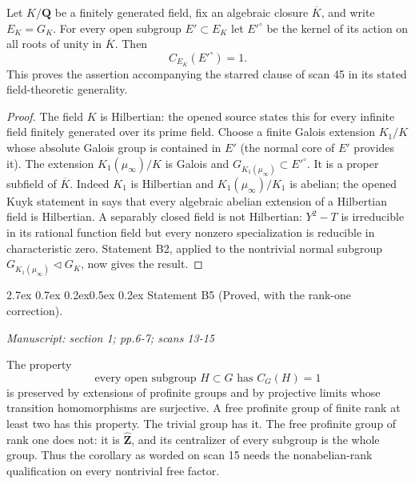 \documentclass[11pt,a4paper]{article}
\makeatletter
\newcommand{\passage}[1]{\par\smallskip\noindent\textit{Manuscript: #1}\par\smallskip}
\renewcommand\paragraph{\@startsection{paragraph}{4}{\z@}%
  {2.7ex \@plus 0.7ex \@minus 0.2ex}{0.5ex \@plus 0.2ex}%
  {\normalfont\normalsize\bfseries}}
\makeatother
\begin{document}
Let $K/\mathbf Q$ be a finitely generated field, fix an algebraic closure
$\overline K$, and write $E_K=G_K$. For every open subgroup $E'\subset E_K$
let $E'^\circ$ be the kernel of its action on all roots of unity in
$\overline K$. Then
\[
 C_{E_K}(E'^\circ)=1.
\]
This proves the assertion accompanying the starred clause of scan 45 in
its stated field-theoretic generality.

\begin{proof}
The field $K$ is Hilbertian: the opened source
\cite[\S4, Theorem 2(e)]{B_Geyer2012} states this for every infinite field
finitely generated over its prime field. Choose a finite Galois extension
$K_1/K$ whose absolute Galois group is contained in $E'$ (the normal core
of $E'$ provides it). The extension $K_1(\mu_\infty)/K$ is Galois and
$G_{K_1(\mu_\infty)}\subset E'^\circ$.
It is a proper subfield of $\overline K$. Indeed $K_1$ is Hilbertian and
$K_1(\mu_\infty)/K_1$ is abelian; the opened Kuyk statement in
\cite[\S4, Theorem 2(g)(2)]{B_Geyer2012} says that every algebraic abelian
extension of a Hilbertian field is Hilbertian. A separably closed field is
not Hilbertian: $Y^2-T$ is irreducible in its rational function field but
every nonzero specialization is reducible in characteristic zero.
Statement B2, applied to the nontrivial normal subgroup
$G_{K_1(\mu_\infty)}\triangleleft G_K$, now gives the result.
\end{proof}

\paragraph{Statement B5 (Proved, with the rank-one correction).}\label{res:B5}
\passage{section 1; pp.6-7; scans 13-15}

The property
\[
 \text{every open subgroup $H\subset G$ has $C_G(H)=1$}
 \tag{B-slim}
\]
is preserved by extensions of profinite groups and by projective limits
whose transition homomorphisms are surjective. A free profinite group of
finite rank at least two has this property. The trivial group has it.
The free profinite group of rank one does not: it is $\widehat{\mathbf Z}$,
and its centralizer of every subgroup is the whole group. Thus the
corollary as worded on scan 15 needs the nonabelian-rank qualification on
every nontrivial free factor.
\end{document}
